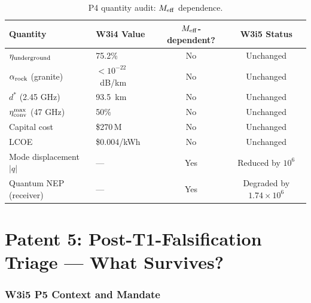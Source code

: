 \documentclass[11pt]{article}
\newcommand{\ee}[1]{\times 10^{#1}}
\newcommand{\Meff}{M_{\rm eff}}
\newcommand{\alpharock}{\alpha_{\rm rock}}
\begin{document}
\begin{table}[h]
\centering
\caption{P4 quantity audit: $\Meff$ dependence.}
\label{tab:P4-Meff-audit}
\begin{tabular}{llcc}
\toprule
\textbf{Quantity} & \textbf{W3i4 Value} & \textbf{$\Meff$-dependent?} & \textbf{W3i5 Status} \\
\midrule
$\eta_{\rm underground}$ & 75.2\% & No & Unchanged \\
$\alpharock$ (granite) & $<10^{-22}$~dB/km & No & Unchanged \\
$d^*$ (2.45 GHz) & 93.5~km & No & Unchanged \\
$\eta_{\rm conv}^{\rm max}$ (47 GHz) & 50\% & No & Unchanged \\
Capital cost & \$270\,M & No & Unchanged \\
LCOE & \$0.004/kWh & No & Unchanged \\
Mode displacement $|q|$ & --- & Yes & Reduced by $10^6$ \\
Quantum NEP (receiver) & --- & Yes & Degraded by $1.74\ee{6}$ \\
\bottomrule
\end{tabular}
\end{table}

\newpage


\part{Patent 5: Post-T1-Falsification Triage --- What Survives?}
\label{part:P5}

\section{W3i5 P5 Context and Mandate}
\label{sec:P5-context}
\end{document}
